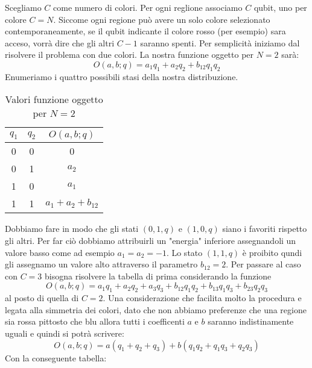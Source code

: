 Scegliamo $C$ come numero di colori. Per ogni reglione associamo $C$ qubit, uno per colore $C = N$. Siccome ogni regione può avere un solo colore selezionato contemporaneamente, se il qubit indicante il colore rosso (per esempio) sara acceso, vorrà dire che gli altri $C-1$ saranno spenti. Per semplicità iniziamo dal risolvere il problema con due colori. La nostra funzione oggetto per $N = 2$ sarà:
$$O(a, b; q) = a_1 q_1 + a_2 q_2 + b_12 q_1 q_2$$
Enumeriamo i quattro possibili stasi della nostra distribuzione.
\begin{table}
  \begin{center}
    \begin{tabular}{ c | c | c }
      $q_1$ & $q_2$ & $O(a, b; q)$       \\ \hline
      0     & 0     & 0                  \\
      0     & 1     & $a_2$              \\
      1     & 0     & $a_1$              \\
      1     & 1     & $a_1 + a_2 + b_12$ \\
    \end{tabular}
    \caption{Valori funzione oggetto per $N = 2$}
  \end{center}
\end{table}
Dobbiamo fare in modo che gli stati $(0,1,q)$ e $(1,0,q)$ siano i favoriti rispetto gli altri. Per far ciò dobbiamo attribuirli un "energia" inferiore assegnandoli un valore basso come ad esempio $a_1 = a_2 = -1$. Lo stato $(1,1,q)$ è proibito qundi gli assegnamo un valore alto attraverso il parametro $b_12 = 2$.
Per passare al caso con $C = 3$ bisogna risolvere la tabella di prima considerando la funzione
$$O(a, b; q) = a_1 q_1 + a_2 q_2 + a_3 q_3 + b_12 q_1 q_2 + b_13 q_1 q_3 + b_23 q_2 q_3$$
al posto di quella di $C = 2$. Una considerazione che facilita molto la procedura e legata alla simmetria dei colori, dato che non abbiamo preferenze che una regione sia rossa pittosto che blu allora tutti i coefficenti $a$ e $b$ saranno indistinamente uguali e quindi si potrà scrivere:
$$O(a, b; q) = a (q_1 + q_2 + q_3) + b (q_1 q_2 + q_1 q_3 + q_2 q_3)$$
Con la conseguente tabella:
